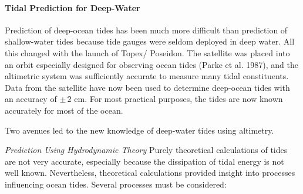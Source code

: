 \paragraph{Tidal Prediction for Deep-Water}
Prediction of deep-ocean tides has
been much more difficult than prediction of shallow-water tides
because tide gauges were seldom deployed in deep water. All this
changed with the launch of Topex/
Poseidon. The satellite
was placed into an orbit especially designed for observing ocean tides
(Parke et al. 1987), and the altimetric system was sufficiently
accurate to measure many tidal constituents.
Data from the satellite have now been used to determine deep-ocean
tides with an accuracy of $\pm \, 2$ cm. For
most practical purposes, the tides are now known accurately for most
of the ocean.

Two avenues led to the new knowledge of deep-water tides using
altimetry.

\textit{Prediction Using Hydrodynamic Theory} Purely theoretical
calculations of 
tides are not very accurate, especially because the dissipation of
tidal energy is not well known. Nevertheless, theoretical calculations
provided insight into processes influencing ocean tides. Several
processes must be considered:


